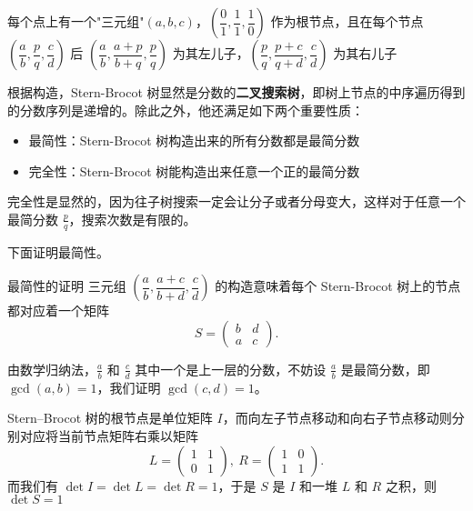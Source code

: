 \documentclass[UTF8]{beamer}
\begin{document}
    \begin{frame}
        每个点上有一个"三元组"$(a,b,c)$，$\left(\dfrac{0}{1},\dfrac{1}{1},\dfrac{1}{0}\right)$ 作为根节点，且在每个节点 $\left(\dfrac{a}{b},\dfrac{p}{q},\dfrac{c}{d}\right)$ 后
$\left(\dfrac{a}{b},\dfrac{a+p}{b+q},\dfrac{p}{q}\right)$ 为其左儿子，$\left(\dfrac{p}{q},\dfrac{p+c}{q+d},\dfrac{c}{d}\right)$ 为其右儿子

        \pause

        根据构造，Stern-Brocot 树显然是分数的\textbf{二叉搜索树}，即树上节点的中序遍历得到的分数序列是递增的。除此之外，他还满足如下两个重要性质：
        \begin{itemize}
            \item 最简性：Stern-Brocot 树构造出来的所有分数都是最简分数
            \item 完全性：Stern-Brocot 树能构造出来任意一个正的最简分数
        \end{itemize}

        \pause

        完全性是显然的，因为往子树搜索一定会让分子或者分母变大，这样对于任意一个最简分数 $\frac{p}{q}$，搜索次数是有限的。

        下面证明最简性。
    \end{frame}

    \begin{frame}{最简性的证明}
        三元组 $\left(\dfrac{a}{b},\dfrac{a+c}{b+d},\dfrac{c}{d}\right)$ 的构造意味着每个 Stern-Brocot 树上的节点都对应着一个矩阵
$$
S = \begin{pmatrix}
b & d\\
a & c
\end{pmatrix}.
$$

由数学归纳法，$\frac ab$ 和 $\frac cd$ 其中一个是上一层的分数，不妨设 $\frac ab$ 是最简分数，即 $\gcd(a,b) = 1$，我们证明 $\gcd(c,d) = 1$。

\pause

Stern–Brocot 树的根节点是单位矩阵 $I$，而向左子节点移动和向右子节点移动则分别对应将当前节点矩阵右乘以矩阵
$$
L=\begin{pmatrix}
1 & 1 \\
0 & 1
\end{pmatrix},\ R=\begin{pmatrix}
1 & 0 \\
1 & 1
\end{pmatrix}.
$$
而我们有 $\det I=\det L=\det R = 1$，于是 $S$ 是 $I$ 和一堆 $L$ 和 $R$ 之积，则 $\det S =1$
    \end{frame}
\end{document}
